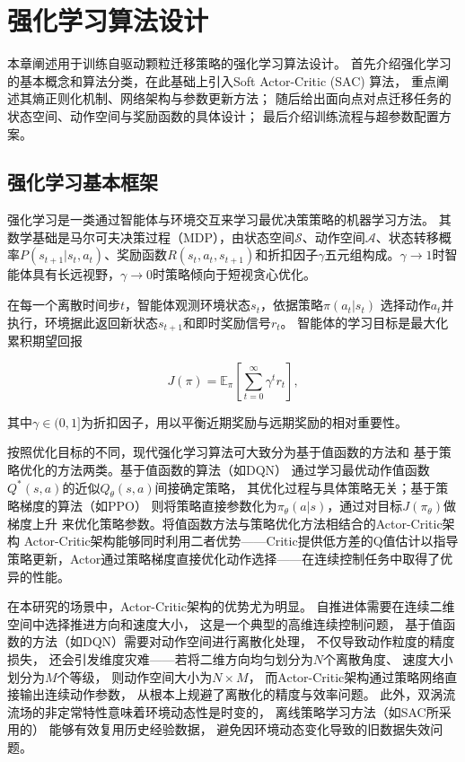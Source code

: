﻿%

\chapter{强化学习算法设计}

本章阐述用于训练自驱动颗粒迁移策略的强化学习算法设计。
首先介绍强化学习的基本概念和算法分类，在此基础上引入Soft Actor-Critic (SAC) 算法，
重点阐述其熵正则化机制、网络架构与参数更新方法；
随后给出面向点对点迁移任务的状态空间、动作空间与奖励函数的具体设计；
最后介绍训练流程与超参数配置方案。

\section{强化学习基本框架}

强化学习是一类通过智能体与环境交互来学习最优决策策略的机器学习方法。
其数学基础是马尔可夫决策过程（MDP），由状态空间$\mathcal{S}$、动作空间$\mathcal{A}$、状态转移概率$P(s_{t+1}|s_t, a_t)$、奖励函数$R(s_t, a_t, s_{t+1})$和折扣因子$\gamma$五元组构成。$\gamma \to 1$时智能体具有长远视野，$\gamma \to 0$时策略倾向于短视贪心优化。

在每一个离散时间步$t$，智能体观测环境状态$s_t$，依据策略$\pi(a_t | s_t)$
选择动作$a_t$并执行，环境据此返回新状态$s_{t+1}$和即时奖励信号$r_t$。
智能体的学习目标是最大化累积期望回报

\begin{equation}
    J(\pi) = \mathbb{E}_{\pi}\left[\sum_{t=0}^{\infty} \gamma^t r_t\right],
    \label{eq:rl_objective}
\end{equation}

其中$\gamma \in (0, 1]$为折扣因子，用以平衡近期奖励与远期奖励的相对重要性。

按照优化目标的不同，现代强化学习算法可大致分为基于值函数的方法和
基于策略优化的方法两类。基于值函数的算法（如DQN）
通过学习最优动作值函数$Q^*(s,a)$的近似$Q_\theta(s,a)$间接确定策略，
其优化过程与具体策略无关；基于策略梯度的算法（如PPO）
则将策略直接参数化为$\pi_\theta(a|s)$，通过对目标$J(\pi_\theta)$做梯度上升
来优化策略参数。将值函数方法与策略优化方法相结合的Actor-Critic架构
Actor-Critic架构能够同时利用二者优势——Critic提供低方差的Q值估计以指导策略更新，Actor通过策略梯度直接优化动作选择——在连续控制任务中取得了优异的性能。

在本研究的场景中，Actor-Critic架构的优势尤为明显。
自推进体需要在连续二维空间中选择推进方向和速度大小，
这是一个典型的高维连续控制问题，
基于值函数的方法（如DQN）需要对动作空间进行离散化处理，
不仅导致动作粒度的精度损失，
还会引发维度灾难——若将二维方向均匀划分为$N$个离散角度、
速度大小划分为$M$个等级，
则动作空间大小为$N \times M$，
而Actor-Critic架构通过策略网络直接输出连续动作参数，
从根本上规避了离散化的精度与效率问题。
此外，双涡流流场的非定常特性意味着环境动态性是时变的，
离线策略学习方法（如SAC所采用的）
能够有效复用历史经验数据，
避免因环境动态变化导致的旧数据失效问题。


